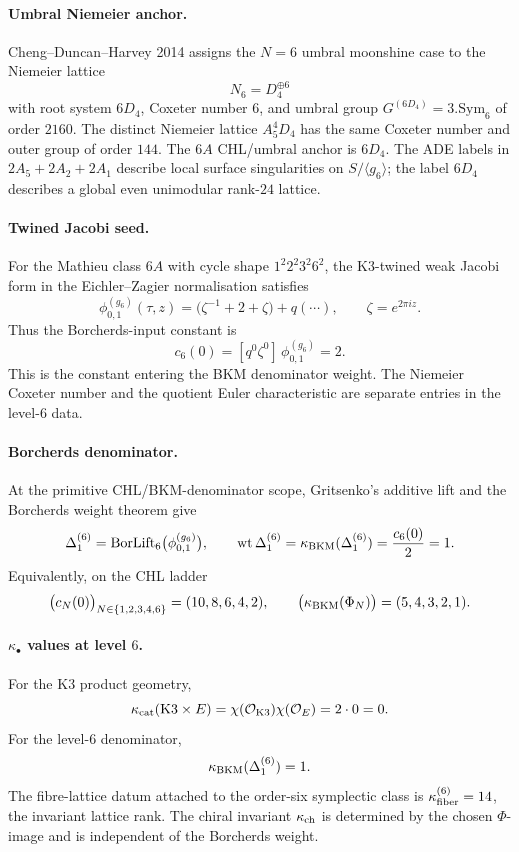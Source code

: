 \paragraph{Umbral Niemeier anchor.}
Cheng--Duncan--Harvey 2014 assigns the $N = 6$ umbral moonshine case to
the Niemeier lattice
\[
  N_6 = D_4^{\oplus 6}
\]
with root system $6D_4$, Coxeter number $6$, and umbral group
$G^{(6D_4)} = 3.\mathrm{Sym}_6$ of order $2160$. The distinct Niemeier
lattice $A_5^4D_4$ has the same Coxeter number and outer group of order
$144$. The $6A$ CHL/umbral anchor is $6D_4$. The ADE labels in
$2A_5+2A_2+2A_1$ describe local surface singularities on
$S/\langle g_6\rangle$; the label $6D_4$ describes a global even
unimodular rank-$24$ lattice.

\paragraph{Twined Jacobi seed.}
For the Mathieu class $6A$ with cycle shape
$1^2 2^2 3^2 6^2$, the K3-twined weak Jacobi form in the
Eichler--Zagier normalisation satisfies
\[
  \phi^{(g_6)}_{0,1}(\tau,z)
  =\bigl(\zeta^{-1}+2+\zeta\bigr)+q(\cdots),
  \qquad \zeta=e^{2\pi iz}.
\]
Thus the Borcherds-input constant is
\[
  c_6(0)=[q^0\zeta^0]\,\phi^{(g_6)}_{0,1}=2 .
\]
This is the constant entering the BKM denominator weight. The Niemeier
Coxeter number and the quotient Euler characteristic are separate
entries in the level-$6$ data.

\paragraph{Borcherds denominator.}
At the primitive CHL/BKM-denominator scope,
Gritsenko's additive lift and the Borcherds weight theorem give
\[
  \Delta_1^{(6)}
  =\mathrm{BorLift}_6\bigl(\phi^{(g_6)}_{0,1}\bigr),
  \qquad
  \mathrm{wt}\,\Delta_1^{(6)}
  =\kappa_{\mathrm{BKM}}(\Delta_1^{(6)})
  =\frac{c_6(0)}{2}=1 .
\]
Equivalently, on the CHL ladder
\[
  \bigl(c_N(0)\bigr)_{N\in\{1,2,3,4,6\}}=(10,8,6,4,2),
  \qquad
  \bigl(\kappa_{\mathrm{BKM}}(\Phi_N)\bigr)=(5,4,3,2,1).
\]

\paragraph{$\kappa_\bullet$ values at level $6$.}
For the K3 product geometry,
\[
  \kappa_{\mathrm{cat}}(\mathrm{K3}\times E)=
  \chi(\mathcal{O}_{\mathrm{K3}})\chi(\mathcal{O}_{E})=2\cdot0=0 .
\]
For the level-$6$ denominator,
\[
  \kappa_{\mathrm{BKM}}(\Delta_1^{(6)})=1 .
\]
The fibre-lattice datum attached to the order-six symplectic class is
$\kappa_{\mathrm{fiber}}^{(6)}=14$, the invariant lattice rank. The chiral invariant
$\kappa_{\mathrm{ch}}$ is determined by the chosen $\Phi$-image and is independent of the
Borcherds weight.

